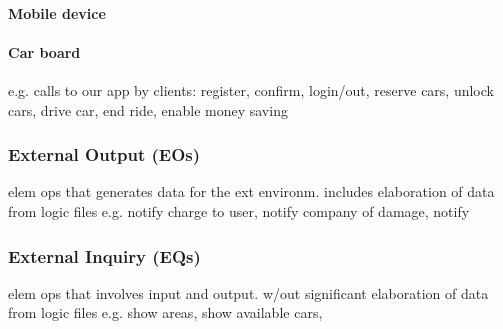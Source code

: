 \paragraph{Mobile device}
\paragraph{Car board}

	e.g. calls to our app by clients: register, confirm, login/out, reserve cars, unlock cars, drive car, end ride, enable money saving

\subsubsection{External Output (EOs)}
	elem ops that generates data for the ext environm. includes elaboration of data from logic files
	e.g. notify charge to user, notify company of damage, notify 

\subsubsection{External Inquiry (EQs)}
	elem ops that involves input and output. w/out significant elaboration of data from logic files
	e.g. show areas, show available cars, 